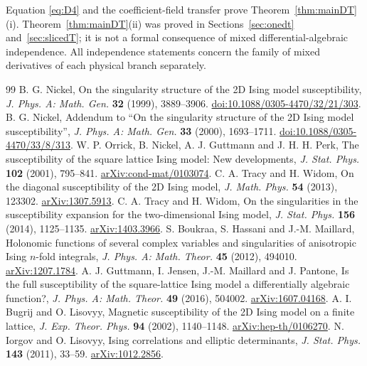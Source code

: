 \documentclass[11pt,a4paper]{article}
\numberwithin{equation}{section}
\theoremstyle{plain}
\theoremstyle{definition}
\begin{document}
Equation \eqref{eq:D4} and the coefficient-field transfer prove Theorem~\ref{thm:mainDT}(i). Theorem~\ref{thm:mainDT}(ii) was proved in Sections~\ref{sec:onedt} and~\ref{sec:slicedT}; it is not a formal consequence of mixed differential-algebraic independence. All independence statements concern the family of mixed derivatives of each physical branch separately.
\begin{thebibliography}{99}
 B. G. Nickel, On the singularity structure of the 2D Ising model susceptibility, \emph{J. Phys. A: Math. Gen.} \textbf{32} (1999), 3889--3906. \href{https://doi.org/10.1088/0305-4470/32/21/303}{doi:10.1088/0305-4470/32/21/303}.
 B. G. Nickel, Addendum to ``On the singularity structure of the 2D Ising model susceptibility'', \emph{J. Phys. A: Math. Gen.} \textbf{33} (2000), 1693--1711. \href{https://doi.org/10.1088/0305-4470/33/8/313}{doi:10.1088/0305-4470/33/8/313}.
 W. P. Orrick, B. Nickel, A. J. Guttmann and J. H. H. Perk, The susceptibility of the square lattice Ising model: New developments, \emph{J. Stat. Phys.} \textbf{102} (2001), 795--841. \href{https://arxiv.org/abs/cond-mat/0103074}{arXiv:cond-mat/0103074}.
 C. A. Tracy and H. Widom, On the diagonal susceptibility of the 2D Ising model, \emph{J. Math. Phys.} \textbf{54} (2013), 123302. \href{https://arxiv.org/abs/1307.5913}{arXiv:1307.5913}.
 C. A. Tracy and H. Widom, On the singularities in the susceptibility expansion for the two-dimensional Ising model, \emph{J. Stat. Phys.} \textbf{156} (2014), 1125--1135. \href{https://arxiv.org/abs/1403.3966}{arXiv:1403.3966}.
 S. Boukraa, S. Hassani and J.-M. Maillard, Holonomic functions of several complex variables and singularities of anisotropic Ising $n$-fold integrals, \emph{J. Phys. A: Math. Theor.} \textbf{45} (2012), 494010. \href{https://arxiv.org/abs/1207.1784}{arXiv:1207.1784}.
 A. J. Guttmann, I. Jensen, J.-M. Maillard and J. Pantone, Is the full susceptibility of the square-lattice Ising model a differentially algebraic function?, \emph{J. Phys. A: Math. Theor.} \textbf{49} (2016), 504002. \href{https://arxiv.org/abs/1607.04168}{arXiv:1607.04168}.
 A. I. Bugrij and O. Lisovyy, Magnetic susceptibility of the 2D Ising model on a finite lattice, \emph{J. Exp. Theor. Phys.} \textbf{94} (2002), 1140--1148. \href{https://arxiv.org/abs/hep-th/0106270}{arXiv:hep-th/0106270}.
 N. Iorgov and O. Lisovyy, Ising correlations and elliptic determinants, \emph{J. Stat. Phys.} \textbf{143} (2011), 33--59. \href{https://arxiv.org/abs/1012.2856}{arXiv:1012.2856}.
\end{thebibliography}
\end{document}
